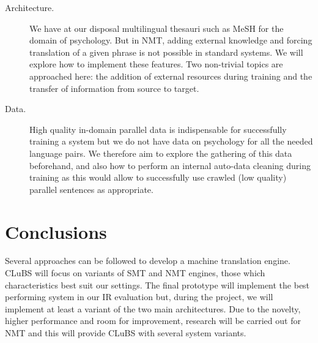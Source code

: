 \documentclass[a4paper,11pt]{article}
\begin{document}
\begin{description}
 \item[Architecture.] We have at our disposal multilingual thesauri such as MeSH for the domain of psychology. But in NMT, adding external knowledge and forcing translation of a given phrase is not possible in standard systems. We will explore how to implement these features. 
 Two non-trivial topics are approached here: the addition of external resources during training and the transfer of information from source to target.
 \item[Data.] High quality in-domain parallel data is indispensable for successfully training a system but we do not have data on psychology for all the needed language pairs. We therefore aim to explore the gathering of this data beforehand, and also how to perform an internal auto-data cleaning during training as this would allow to successfully use crawled (low quality) parallel sentences as appropriate.
\end{description}




\section{Conclusions}
\label{s:conclusions}

Several approaches can be followed to develop a machine translation engine. CLuBS will focus on variants of SMT and NMT engines, those which characteristics best suit our settings. The final prototype will implement the best performing system in our IR evaluation but, during the project, we will implement at least a variant of the two main architectures. Due to the novelty, higher performance and room for improvement, research will be carried out for NMT and this will provide CLuBS with several system variants.

%
%
% 
% 
\end{document}
